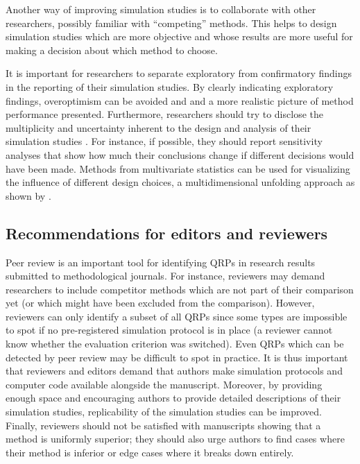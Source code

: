 \documentclass[a4paper, 11pt]{article}
\begin{document}
Another way of improving simulation studies is to collaborate with other
researchers, possibly familiar with ``competing'' methods. This helps to
design simulation studies which are more objective and whose results are more
useful for making a decision about which method to choose. 

It is important for researchers to separate exploratory from confirmatory findings 
in the reporting of their simulation studies. By clearly indicating exploratory findings,
overoptimism can be avoided and and a more realistic picture of method performance
presented. Furthermore, researchers should try to disclose the multiplicity and
uncertainty inherent to the design and analysis of their simulation studies 
\citep{Hoffmann2021}. For instance, if possible, they should report sensitivity
analyses that show how much their conclusions change if different decisions 
would have been made. Methods from multivariate statistics can be used for
visualizing the influence of different design choices, \eg a multidimensional
unfolding approach as shown by \citet{Niessl2021}.

\subsection{Recommendations for editors and reviewers}
Peer review is an important tool for identifying QRPs in research results 
submitted to methodological journals. 
For instance, reviewers may demand researchers to include competitor 
methods which are not part of their comparison yet (or which might have been 
excluded from the comparison). However, reviewers can only identify a subset 
of all QRPs since some types are impossible to spot if no pre-registered 
simulation protocol is in place (\eg a reviewer cannot know whether the evaluation
criterion was switched). Even QRPs which can be detected by peer review
may be difficult to spot in practice.
It is thus important that reviewers and editors demand that authors make
simulation protocols and computer code available alongside the manuscript. 
Moreover, by providing enough space and encouraging authors to provide detailed 
descriptions of their simulation studies, replicability of the simulation 
studies can be improved. Finally, reviewers should not be satisfied with 
manuscripts showing that a method is uniformly superior; they should 
also urge authors to find cases where their method is inferior or edge 
cases where it breaks down entirely.
\end{document}
